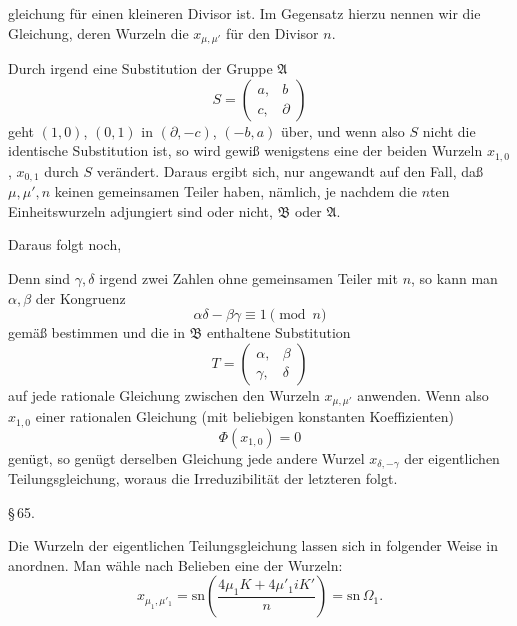 gleichung für einen kleineren Divisor ist. Im Gegensatz hierzu
nennen wir die Gleichung, deren Wurzeln die  $x_{\mu,\mu'}$ %
 für den Divisor $n$.

Durch irgend eine Substitution der Gruppe $\mathfrak{A}$
\[
S = \begin{pmatrix} a, & b\\ c, & \partial \end{pmatrix}
\]
geht $(1,0)$, $(0,1)$ in $(\partial, -c)$, $(-b, a)$ über, und wenn also $S$ nicht
die identische Substitution ist, so wird gewiß wenigstens eine der
beiden Wurzeln $x_{1,0}$, $x_{0,1}$ durch $S$ verändert. Daraus ergibt sich,
nur angewandt auf den Fall, daß $\mu, \mu', n$ keinen gemeinsamen
Teiler haben, nämlich, je nachdem die $n$ten Einheitswurzeln
adjungiert sind oder nicht, $\mathfrak{B}$ oder $\mathfrak{A}$.

Daraus folgt noch, 

Denn sind $\gamma, \delta$ irgend zwei Zahlen ohne gemeinsamen Teiler
mit $n$, so kann man $\alpha, \beta$ der Kongruenz
\[
\alpha\delta - \beta\gamma \equiv 1 \pmod{n}
\]
gemäß bestimmen und die in $\mathfrak{B}$ enthaltene Substitution
\[
T = \begin{pmatrix} \alpha, & \beta\\ \gamma, & \delta \end{pmatrix}
\]
auf jede rationale Gleichung zwischen den Wurzeln $x_{\mu,\mu'}$ anwenden.
Wenn also $x_{1,0}$ einer rationalen Gleichung (mit beliebigen konstanten
Koeffizienten)
\[
\Phi(x_{1,0}) = 0
\]
genügt, so genügt derselben Gleichung jede andere Wurzel $x_{\delta,-\gamma}$
der eigentlichen Teilungsgleichung, woraus die Irreduzibilität der
letzteren folgt.

\begin{center}
\S\,65. \\
\end{center}
Die Wurzeln der eigentlichen Teilungsgleichung lassen sich
in folgender Weise in  anordnen. Man wähle nach Belieben
eine der Wurzeln:
\[
x_{\mu_1,\mu'_1} = \mathrm{sn}\left(\frac{4\mu_1 K + 4\mu'_1 iK'}{n}\right) = \mathrm{sn}\,\Omega_1.
\]
